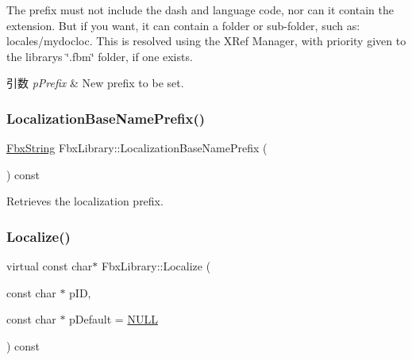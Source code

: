 The prefix must not include the dash and language code, nor can it contain the extension. But if you want, it can contain a folder or sub-\/folder, such as\+: locales/mydocloc. This is resolved using the X\+Ref Manager, with priority given to the library\textquotesingle{}s \char`\"{}.\+fbm\char`\"{} folder, if one exists. 
\begin{DoxyParams}{引数}
{\em p\+Prefix} & New prefix to be set. \\
\hline
\end{DoxyParams}
\mbox{\label{class_fbx_library_acfd1439811766c38c8b3fce758787603}} 
\subsubsection{\texorpdfstring{Localization\+Base\+Name\+Prefix()}{LocalizationBaseNamePrefix()}\hspace{0.1cm}{\footnotesize\ttfamily [2/2]}}
{\footnotesize\ttfamily \hyperlink{class_fbx_string}{Fbx\+String} Fbx\+Library\+::\+Localization\+Base\+Name\+Prefix (\begin{DoxyParamCaption}{ }\end{DoxyParamCaption}) const}



Retrieves the localization prefix. 

\mbox{\label{class_fbx_library_a6f71bf208f95cc8033123e173e64b298}} 
\subsubsection{\texorpdfstring{Localize()}{Localize()}}
{\footnotesize\ttfamily virtual const char$\ast$ Fbx\+Library\+::\+Localize (\begin{DoxyParamCaption}\item[{const char $\ast$}]{p\+ID,  }\item[{const char $\ast$}]{p\+Default = {\ttfamily \hyperlink{fbxarch_8h_a070d2ce7b6bb7e5c05602aa8c308d0c4}{N\+U\+LL}} }\end{DoxyParamCaption}) const\hspace{0.3cm}{\ttfamily [virtual]}}


